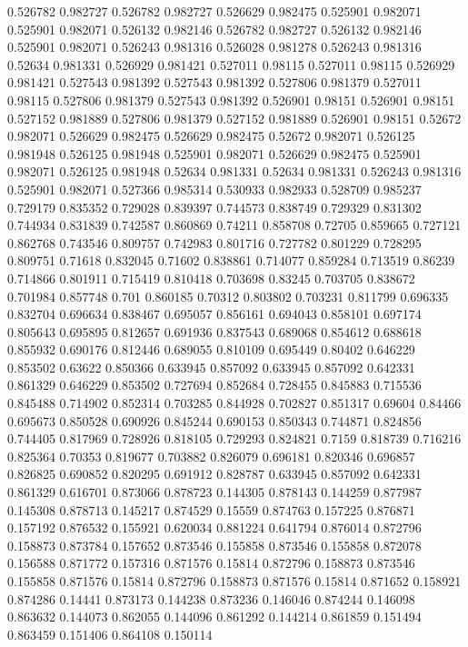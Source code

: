 0.526782 0.982727
0.526782 0.982727
0.526629 0.982475
0.525901 0.982071
0.525901 0.982071
0.526132 0.982146
0.526782 0.982727
0.526132 0.982146
0.525901 0.982071
0.526243 0.981316
0.526028 0.981278
0.526243 0.981316
0.52634 0.981331
0.526929 0.981421
0.527011 0.98115
0.527011 0.98115
0.526929 0.981421
0.527543 0.981392
0.527543 0.981392
0.527806 0.981379
0.527011 0.98115
0.527806 0.981379
0.527543 0.981392
0.526901 0.98151
0.526901 0.98151
0.527152 0.981889
0.527806 0.981379
0.527152 0.981889
0.526901 0.98151
0.52672 0.982071
0.526629 0.982475
0.526629 0.982475
0.52672 0.982071
0.526125 0.981948
0.526125 0.981948
0.525901 0.982071
0.526629 0.982475
0.525901 0.982071
0.526125 0.981948
0.52634 0.981331
0.52634 0.981331
0.526243 0.981316
0.525901 0.982071
0.527366 0.985314
0.530933 0.982933
0.528709 0.985237
0.729179 0.835352
0.729028 0.839397
0.744573 0.838749
0.729329 0.831302
0.744934 0.831839
0.742587 0.860869
0.74211 0.858708
0.72705 0.859665
0.727121 0.862768
0.743546 0.809757
0.742983 0.801716
0.727782 0.801229
0.728295 0.809751
0.71618 0.832045
0.71602 0.838861
0.714077 0.859284
0.713519 0.86239
0.714866 0.801911
0.715419 0.810418
0.703698 0.83245
0.703705 0.838672
0.701984 0.857748
0.701 0.860185
0.70312 0.803802
0.703231 0.811799
0.696335 0.832704
0.696634 0.838467
0.695057 0.856161
0.694043 0.858101
0.697174 0.805643
0.695895 0.812657
0.691936 0.837543
0.689068 0.854612
0.688618 0.855932
0.690176 0.812446
0.689055 0.810109
0.695449 0.80402
0.646229 0.853502
0.63622 0.850366
0.633945 0.857092
0.633945 0.857092
0.642331 0.861329
0.646229 0.853502
0.727694 0.852684
0.728455 0.845883
0.715536 0.845488
0.714902 0.852314
0.703285 0.844928
0.702827 0.851317
0.69604 0.84466
0.695673 0.850528
0.690926 0.845244
0.690153 0.850343
0.744871 0.824856
0.744405 0.817969
0.728926 0.818105
0.729293 0.824821
0.7159 0.818739
0.716216 0.825364
0.70353 0.819677
0.703882 0.826079
0.696181 0.820346
0.696857 0.826825
0.690852 0.820295
0.691912 0.828787
0.633945 0.857092
0.642331 0.861329
0.616701 0.873066
0.878723 0.144305
0.878143 0.144259
0.877987 0.145308
0.878713 0.145217
0.874529 0.15559
0.874763 0.157225
0.876871 0.157192
0.876532 0.155921
0.620034 0.881224
0.641794 0.876014
0.872796 0.158873
0.873784 0.157652
0.873546 0.155858
0.873546 0.155858
0.872078 0.156588
0.871772 0.157316
0.871576 0.15814
0.872796 0.158873
0.873546 0.155858
0.871576 0.15814
0.872796 0.158873
0.871576 0.15814
0.871652 0.158921
0.874286 0.14441
0.873173 0.144238
0.873236 0.146046
0.874244 0.146098
0.863632 0.144073
0.862055 0.144096
0.861292 0.144214
0.861859 0.151494
0.863459 0.151406
0.864108 0.150114

